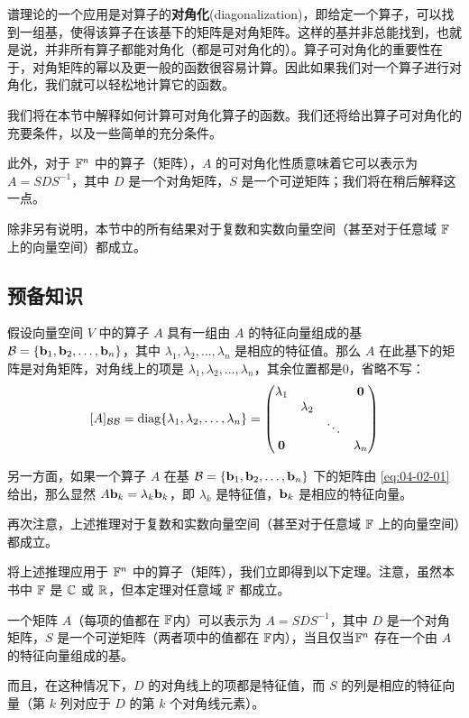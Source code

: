 谱理论的一个应用是对算子的\textbf{对角化}(diagonalization)，即给定一个算子，可以找到一组基，使得该算子在该基下的矩阵是对角矩阵。这样的基并非总能找到，也就是说，并非所有算子都能对角化（都是可对角化的）。算子可对角化的重要性在于，对角矩阵的幂以及更一般的函数很容易计算。因此如果我们对一个算子进行对角化，我们就可以轻松地计算它的函数。

我们将在本节中解释如何计算可对角化算子的函数。我们还将给出算子可对角化的充要条件，以及一些简单的充分条件。

此外，对于 $\mathbb{F}^n$ 中的算子（矩阵），$A$ 的可对角化性质意味着它可以表示为 $A = SDS^{-1}$，其中 $D$ 是一个对角矩阵，$S$ 是一个可逆矩阵；我们将在稍后解释这一点。

除非另有说明，本节中的所有结果对于复数和实数向量空间（甚至对于任意域 $\mathbb{F}$ 上的向量空间）都成立。

\subsection{预备知识}\label{sec:04-02-01}

假设向量空间 $V$ 中的算子 $A$ 具有一组由 $A$ 的特征向量组成的基 $\mathcal{B} = \{\mathbf{b}_1, \mathbf{b}_2, \dots, \mathbf{b}_n\}$，其中 $\lambda_1, \lambda_2, \dots, \lambda_n$ 是相应的特征值。那么 $A$ 在此基下的矩阵是对角矩阵，对角线上的项是 $\lambda_1, \lambda_2, \dots, \lambda_n$，其余位置都是$0$，省略不写：
\begin{equation}\label{eq:04-02-01}
[A]_{\mathcal{B}\mathcal{B}} = \operatorname{diag}\{\lambda_1, \lambda_2, \dots, \lambda_n\} = \begin{pmatrix} \lambda_1 & & &\mathbf{0} \\ & \lambda_2 & & \\ & & \ddots & \\ \mathbf{0}& & & \lambda_n \end{pmatrix}
\end{equation}

另一方面，如果一个算子 $A$ 在基 $\mathcal{B} = \{\mathbf{b}_1, \mathbf{b}_2, \dots, \mathbf{b}_n\}$ 下的矩阵由 \eqref{eq:04-02-01} 给出，那么显然 $A\mathbf{b}_k = \lambda_k \mathbf{b}_k$，即 $\lambda_k$ 是特征值，$\mathbf{b}_k$ 是相应的特征向量。

再次注意，上述推理对于复数和实数向量空间（甚至对于任意域 $\mathbb{F}$ 上的向量空间）都成立。

将上述推理应用于 $\mathbb{F}^n$ 中的算子（矩阵），我们立即得到以下定理。注意，虽然本书中 $\mathbb{F}$ 是 $\mathbb{C}$ 或 $\mathbb{R}$，但本定理对任意域 $\mathbb{F}$ 都成立。

\begin{theorem}\label{stmt:04-02-01} 一个矩阵 $A$（每项的值都在 $\mathbb{F}$内）可以表示为 $A = SDS^{-1}$，其中 $D$ 是一个对角矩阵，$S$ 是一个可逆矩阵（两者项中的值都在 $\mathbb{F}$内），当且仅当$\mathbb{F}^n$ 存在一个由 $A$ 的特征向量组成的基。

而且，在这种情况下，$D$ 的对角线上的项都是特征值，而 $S$ 的列是相应的特征向量（第 $k$ 列对应于 $D$ 的第 $k$ 个对角线元素）。\end{theorem}

